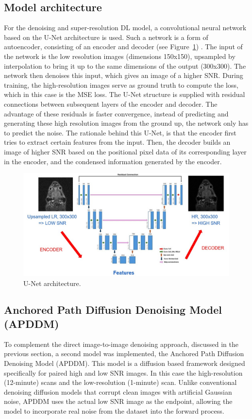 \documentclass[twocolumn]{article}
\begin{document}
\subsection{Model architecture}
For the denoising and super-resolution DL model, a convolutional neural network based on the U-Net architecture is used. 
Such a network is a form of autoencoder, consisting of an encoder and decoder (see Figure~\ref{fig:U-Net}) \cite{ronneberger2015unet}.
The input of the network is the low resolution images (dimensions 150x150), upsampled by interpolation to bring it up to the same dimensions of the output (300x300). 
The network then denoises this input, which gives an image of a higher SNR. During training, the high-resolution images serve as ground truth to compute the loss, which in this case is the MSE loss. 
The U-Net structure is supplied with residual connections between subsequent layers of the encoder and decoder. 
The advantage of these residuals is faster convergence, instead of predicting and generating these high resolution images from the ground up, the network only has to predict the noise. 
The rationale behind this U-Net, is that the encoder first tries to extract certain features from the input. 
Then, the decoder builds an image of higher SNR based on the positional pixel data of its corresponding layer in the encoder, and the condensed information generated by the encoder. 

\begin{figure}
    \centering
    \includegraphics[width=0.5\linewidth]{U-Net.jpg}
    \caption{U-Net architecture.}
    \label{fig:U-Net}
\end{figure}





\subsection{Anchored Path Diffusion Denoising Model (APDDM)}
To complement the direct image-to-image denoising approach, discussed in the previous section, a second model was implemented, the Anchored Path Diffusion Denoising Model (APDDM). This model is a diffusion based framework designed specifically for paired high and low SNR images. In this case the high-resolution (12-minute) scans and the low-resolution (1-minute) scan. Unlike conventional denoising diffusion models that corrupt clean images with artificial Gaussian noise, APDDM uses the actual low SNR image as the endpoint, allowing the model to incorporate real noise from the dataset into the forward process. 
\end{document}
